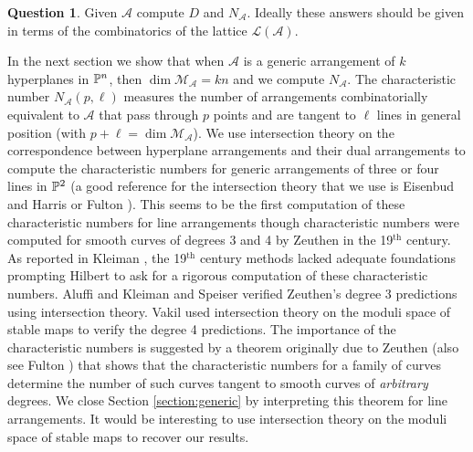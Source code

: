 \documentclass[12pt]{article}
\theoremstyle{plain}
\theoremstyle{definition}
\newtheorem{question}[theorem]{Question}
\newcommand{\A}{\mathcal{A}}
\newcommand{\M}{\mathcal{M}}
\newcommand{\N}{N}
\renewcommand{\L}{\mathcal{L}}
\renewcommand{\P}{\ensuremath \mathbb{P}}
\newcommand{\NO}{NO}
\newcommand{\NU}{NU}
\begin{document}

\begin{question} \label{mainq} Given $\A$ compute $D$ and $\N_\A$. Ideally these
  answers should be given in terms of the combinatorics of the lattice
  $\L(\A)$. 
\end{question} 

In the next section we show that when $\A$ is a generic arrangement of
$k$ hyperplanes in $\P^n$, then $\dim \M_\A = kn$ and we compute
$\N_\A$. The characteristic number $N_\A(p,\ell)$ measures the
number of arrangements combinatorially equivalent to $\A$ that pass
through $p$ points and are tangent to $\ell$ lines in general position
(with $p + \ell = \dim \M_\A$). We use intersection theory on the correspondence
between hyperplane arrangements and their dual arrangements to compute
the characteristic numbers for generic arrangements of three or four
lines in $\P^2$ (a good reference for the intersection theory that we
use is Eisenbud and Harris \cite{EH} or Fulton \cite{Fulton}). This seems to be the first computation
of these characteristic numbers for line arrangements though
characteristic numbers were computed for smooth curves of degrees 3
and 4 by Zeuthen \cite{Zeuthen} in the 19$^\text{th}$ century. As reported in Kleiman  \cite{Kleiman15}, the
19$^\text{th}$ century methods lacked adequate foundations prompting
Hilbert to ask for a rigorous computation of these characteristic
numbers. Aluffi \cite{Aluffi} and Kleiman and Speiser
\cite{KSp} verified Zeuthen's degree 3 predictions using intersection
theory. Vakil \cite{Vakil} used intersection theory on the moduli
space of stable maps to verify the degree 4 predictions. The
importance of the characteristic numbers is suggested by a theorem
originally due to Zeuthen \cite{Zeuthenbook} (also see Fulton
\cite[section 10.4]{Fulton}) that shows that the characteristic
numbers for a family of curves determine the number of such curves
tangent to smooth curves of {\em arbitrary} degrees. We close Section
\ref{section:generic} by interpreting this theorem for line arrangements. It would be interesting to use intersection theory on the moduli space of stable maps to recover our results.
\end{document}
